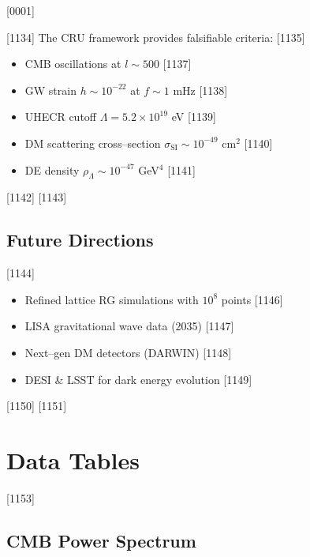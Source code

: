 [0001] \documentclass[12pt]{report}
[0002] \usepackage[utf8]{inputenc}
\begin{document}
[1134] The CRU framework provides falsifiable criteria:  
[1135] \begin{itemize}
[1136] \item CMB oscillations at $l \sim 500$  
[1137] \item GW strain $h \sim 10^{-22}$ at $f \sim 1$ mHz  
[1138] \item UHECR cutoff $\Lambda = 5.2 \times 10^{19}$ eV  
[1139] \item DM scattering cross–section $\sigma_{\text{SI}} \sim 10^{-49}$ cm$^2$  
[1140] \item DE density $\rho_\Lambda \sim 10^{-47}$ GeV$^4$  
[1141] \end{itemize}
[1142] 
[1143] \section{Future Directions}
[1144] \begin{itemize}
[1145] \item Refined lattice RG simulations with $10^8$ points  
[1146] \item LISA gravitational wave data (2035)  
[1147] \item Next–gen DM detectors (DARWIN)  
[1148] \item DESI & LSST for dark energy evolution  
[1149] \end{itemize}
[1150] 
[1151] \appendix
[1152] \chapter{Data Tables}
[1153] \section{CMB Power Spectrum}
\end{document}
